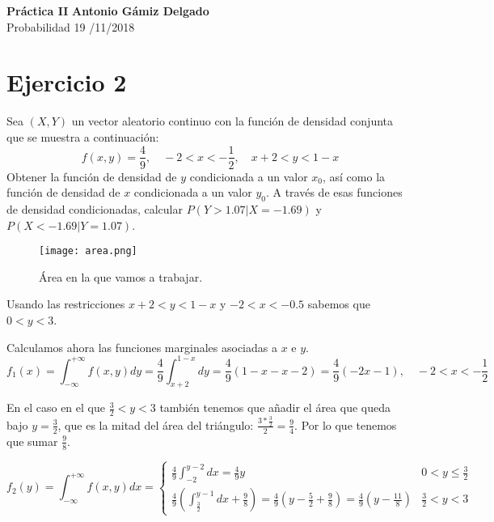 \documentclass[a4paper, 11pt]{article}
\begin{document}
\noindent
\large\textbf{Práctica II} \hfill \textbf{Antonio Gámiz Delgado} \\
\normalsize Probabilidad \hfill 19 /11/2018

\section*{Ejercicio 2}
Sea $(X,Y)$ un vector aleatorio continuo con la función de densidad conjunta que se muestra a continuación:
\[
f(x,y)=\frac{4}{9}, \quad -2<x<-\frac{1}{2}, \quad x+2<y<1-x
\]
Obtener la función de densidad de $y$ condicionada a un valor $x_0$, así como la función de densidad de $x$ condicionada a un valor $y_0$. A través de esas funciones de densidad condicionadas, calcular $P(Y>1.07|X=-1.69)$ y $P(X<-1.69|Y=1.07)$. \\[0.1cm]

\begin{figure}[h]
\center
\texttt{[image: area.png]}
\caption{Área en la que vamos a trabajar.}
\end{figure}

Usando las restricciones $x+2<y<1-x$ y $-2<x<-0.5$ sabemos que $0<y<3$.

Calculamos ahora las funciones marginales asociadas a $x$ e $y$.
\[
f_1(x)=\int_{-\infty}^{+\infty}f(x,y)dy=\frac{4}{9}\int_{x+2}^{1-x}dy=\frac{4}{9}\left(1-x-x-2\right)=\frac{4}{9}\left(-2x-1\right), \quad -2<x<-\frac{1}{2}
\]

En el caso en el que $\frac{3}{2} < y < 3$ también tenemos que añadir el área que queda bajo $y=\frac{3}{2}$, que es la mitad del área del triángulo: $\frac{3*\frac{3}{2}}{2}=\frac{9}{4}$. Por lo que tenemos que sumar $\frac{9}{8}$.

\[
f_2(y)=\int_{-\infty}^{+\infty}f(x,y)dx=\left \{ \begin{array}{ll}
\displaystyle\frac{4}{9}\int_{-2}^{y-2}dx=\frac{4}{9}y & 0<y\leq\frac{3}{2}\\
\displaystyle\frac{4}{9}\left(\int_{\frac{3}{2}}^{y-1}dx+\frac{9}{8}\right)=\frac{4}{9}\left(y-\frac{5}{2}+\frac{9}{8}\right)=\frac{4}{9}\left(y-\frac{11}{8}\right)& \frac{3}{2} < y < 3

\end{array}\right.
\]
\end{document}
